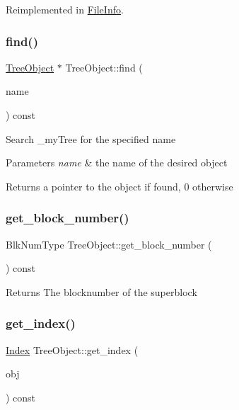 Reimplemented in \mbox{\hyperlink{classFileInfo_ae058242283d3317eaf2b79428e6137f6}{File\+Info}}.

\mbox{\label{classTreeObject_a6a7477c29a06a9896df549f83611252f}} 
\subsubsection{\texorpdfstring{find()}{find()}}
{\footnotesize\ttfamily \mbox{\hyperlink{classTreeObject}{Tree\+Object}} $\ast$ Tree\+Object\+::find (\begin{DoxyParamCaption}\item[{string}]{name }\end{DoxyParamCaption}) const}

Search \+\_\+my\+Tree for the specified name 
\begin{DoxyParams}{Parameters}
{\em name} & the name of the desired object \\
\hline
\end{DoxyParams}
\begin{DoxyReturn}{Returns}
a pointer to the object if found, 0 otherwise 
\end{DoxyReturn}
\mbox{\label{classTreeObject_af7841065fe85d0884341d72669185169}} 
\subsubsection{\texorpdfstring{get\+\_\+block\+\_\+number()}{get\_block\_number()}}
{\footnotesize\ttfamily Blk\+Num\+Type Tree\+Object\+::get\+\_\+block\+\_\+number (\begin{DoxyParamCaption}{ }\end{DoxyParamCaption}) const}

\begin{DoxyReturn}{Returns}
The blocknumber of the superblock 
\end{DoxyReturn}
\mbox{\label{classTreeObject_ae0983a3ff99d413e22beaaac8d7b6d12}} 
\subsubsection{\texorpdfstring{get\+\_\+index()}{get\_index()}}
{\footnotesize\ttfamily \mbox{\hyperlink{structindex}{Index}} Tree\+Object\+::get\+\_\+index (\begin{DoxyParamCaption}\item[{\mbox{\hyperlink{classTreeObject}{Tree\+Object}} $\ast$}]{obj }\end{DoxyParamCaption}) const}

